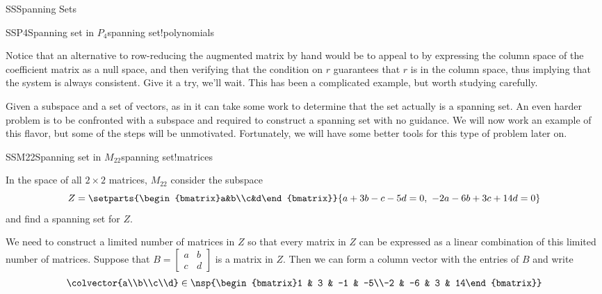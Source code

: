 \begin{subsect}{SS}{Spanning Sets}
\begin{example}{SSP4}{Spanning set in $P_4$}{spanning set!polynomials}
%
\begin{para}Notice that an alternative to row-reducing the augmented matrix by hand would be to appeal to  by expressing the column space of the coefficient matrix as a null space, and then verifying that the condition on $r$ guarantees that $r$ is in the column space, thus implying that the system is always consistent.  Give it a try, we'll wait.  This has been a complicated example, but worth studying carefully.\end{para}
%
\end{example}
%
\begin{para}Given a subspace and a set of vectors, as in  it can take some work to determine that the set actually is a spanning set.  An even harder problem is to be confronted with a subspace and required to construct a spanning set with no guidance.  We will now work  an example of this flavor, but some of the steps will be unmotivated.  Fortunately, we will have some better tools for this type of problem later on.\end{para}
%
\begin{example}{SSM22}{Spanning set in $M_{22}$}{spanning set!matrices}
\begin{para}In the space of all $2\times 2$ matrices, $M_{22}$ consider the subspace
%
\begin{equation*}
Z=\setparts{\begin{bmatrix}a&b\\c&d\end{bmatrix}}{a+3b-c-5d=0,\ -2a-6b+3c+14d=0}
\end{equation*}
%
and find a spanning set for $Z$.\end{para}
%
\begin{para}
We need to construct a limited number of matrices in $Z$ so that every matrix in $Z$ can be expressed as a linear combination of this limited number of matrices.  Suppose that $B=\begin{bmatrix}a&b\\c&d\end{bmatrix}$ is a matrix in $Z$.  Then we can form a column vector with the entries of $B$ and write
%
\begin{equation*}
\colvector{a\\b\\c\\d}\in
\nsp{\begin{bmatrix}1 & 3 & -1 & -5\\-2 & -6 & 3 & 14\end{bmatrix}}

\end{equation*}
\end{para}
\end{example}
\end{subsect}
